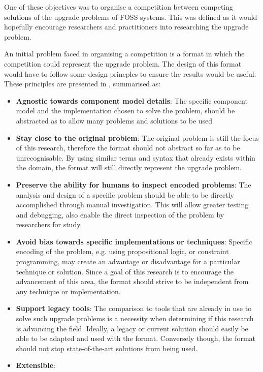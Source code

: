 One of these objectives was to organise a competition between competing solutions of the upgrade problems of FOSS systems.
This was defined as it would hopefully encourage researchers and practitioners into researching the upgrade problem.

An initial problem faced in organising a competition is a format in which the competition could represent the upgrade problem.
The design of this format would have to follow some design princples to ensure the results would be useful.
These principles are presented in \cite{treinen2009common}, summarised as:

\begin{itemize}
  \item \textbf{Agnostic towards component model details}: 
  The specific component model and the implementation chosen to solve the problem, should be abstracted as to allow many problems and solutions to be used  
  \item \textbf{Stay close to the original problem}: 
  The original problem is still the focus of this research, therefore the format should not abstract so far as to be unrecognisable. 
  By using similar terms and syntax that already exists within the domain, the format will still directly represent the upgrade problem. 
  \item \textbf{Preserve the ability for humans to inspect encoded problems}:
  The analysis and design of a specific problem should be able to be directly accomplished through manual investigation.
  This will allow greater testing and debugging, also enable the direct inspection of the problem by researchers for study.
  \item \textbf{Avoid bias towards specific implementations or techniques}:
  Specific encoding of the problem, e.g. using propositional logic, or constraint programming, may create an advantage or disadvantage for a particular technique or solution.
  Since a goal of this research is to encourage the advancement of this area, the format should strive to be independent from any technique or implementation. 
  \item \textbf{Support legacy tools}:
  The comparison to tools that are already in use to solve such upgrade problems is a necessity when determining if this research is advancing the field.
  Ideally, a legacy or current solution should easily be able to be adapted and used with the format.
  Conversely though, the format should not stop state-of-the-art solutions from being used.
  \item \textbf{Extensible}:

\end{itemize}
